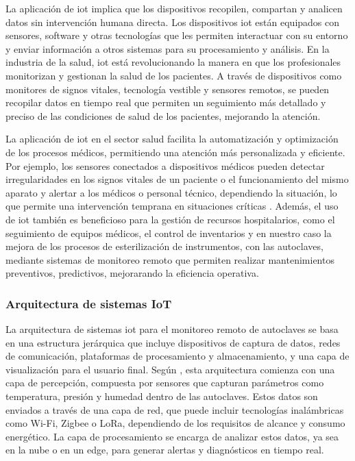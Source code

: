 La aplicación de \acrshort{iot} implica que los dispositivos recopilen, compartan y analicen datos sin intervención humana directa. Los dispositivos \acrshort{iot} están equipados con sensores, software y otras tecnologías que les permiten interactuar con su entorno y enviar información a otros sistemas para su procesamiento y análisis.
En la industria de la salud, \acrshort{iot} está revolucionando la manera en que los profesionales monitorizan y gestionan la salud de los pacientes. A través de dispositivos como monitores de signos vitales, tecnología vestible y sensores remotos, se pueden recopilar datos en tiempo real que permiten un seguimiento más detallado y preciso de las condiciones de salud de los pacientes, mejorando la atención.

La aplicación de \acrshort{iot} en el sector salud facilita la automatización y optimización de los procesos médicos, permitiendo una atención más personalizada y eficiente. Por ejemplo, los sensores conectados a dispositivos médicos pueden detectar irregularidades en los signos vitales de un paciente o el funcionamiento del mismo aparato y alertar a los médicos o personal técnico, dependiendo la situación, lo que permite una intervención temprana en situaciones críticas \citep{Islam2015}. Además, el uso de  \acrshort{iot} también es beneficioso para la gestión de recursos hospitalarios, como el seguimiento de equipos médicos, el control de inventarios y en nuestro caso la mejora de los procesos de esterilización de instrumentos, con las autoclaves, mediante sistemas de monitoreo remoto que permiten realizar mantenimientos preventivos, predictivos, mejorarando la eficiencia operativa.

\subsubsection{Arquitectura de sistemas IoT}
La arquitectura de sistemas \acrshort{iot} para el monitoreo remoto de autoclaves se basa en una estructura jerárquica que incluye dispositivos de captura de datos, redes de comunicación, plataformas de procesamiento y almacenamiento, y una capa de visualización para el usuario final. Según \cite{Bandyopadhyay2011}, esta arquitectura comienza con una capa de percepción, compuesta por sensores que capturan parámetros como temperatura, presión y humedad dentro de las autoclaves. Estos datos son enviados a través de una capa de red, que puede incluir tecnologías inalámbricas como Wi-Fi, Zigbee o LoRa, dependiendo de los requisitos de alcance y consumo energético. La capa de procesamiento se encarga de analizar estos datos, ya sea en la nube o en un \acrfull{edge}, para generar alertas y diagnósticos en tiempo real.

